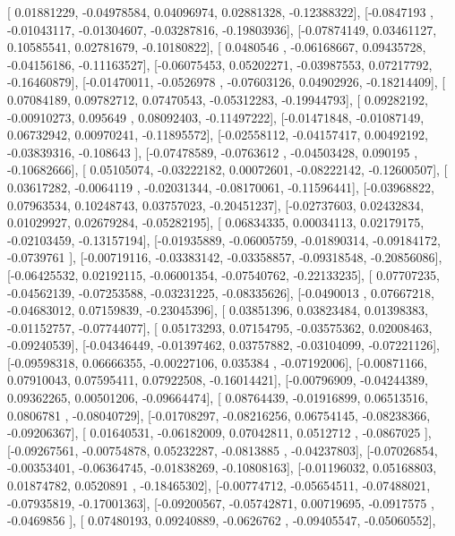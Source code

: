 \documentclass{article}
\begin{document}
       [ 0.01881229, -0.04978584,  0.04096974,  0.02881328, -0.12388322],
       [-0.0847193 , -0.01043117, -0.01304607, -0.03287816, -0.19803936],
       [-0.07874149,  0.03461127,  0.10585541,  0.02781679, -0.10180822],
       [ 0.0480546 , -0.06168667,  0.09435728, -0.04156186, -0.11163527],
       [-0.06075453,  0.05202271, -0.03987553,  0.07217792, -0.16460879],
       [-0.01470011, -0.0526978 , -0.07603126,  0.04902926, -0.18214409],
       [ 0.07084189,  0.09782712,  0.07470543, -0.05312283, -0.19944793],
       [ 0.09282192, -0.00910273,  0.095649  ,  0.08092403, -0.11497222],
       [-0.01471848, -0.01087149,  0.06732942,  0.00970241, -0.11895572],
       [-0.02558112, -0.04157417,  0.00492192, -0.03839316, -0.108643  ],
       [-0.07478589, -0.0763612 , -0.04503428,  0.090195  , -0.10682666],
       [ 0.05105074, -0.03222182,  0.00072601, -0.08222142, -0.12600507],
       [ 0.03617282, -0.0064119 , -0.02031344, -0.08170061, -0.11596441],
       [-0.03968822,  0.07963534,  0.10248743,  0.03757023, -0.20451237],
       [-0.02737603,  0.02432834,  0.01029927,  0.02679284, -0.05282195],
       [ 0.06834335,  0.00034113,  0.02179175, -0.02103459, -0.13157194],
       [-0.01935889, -0.06005759, -0.01890314, -0.09184172, -0.0739761 ],
       [-0.00719116, -0.03383142, -0.03358857, -0.09318548, -0.20856086],
       [-0.06425532,  0.02192115, -0.06001354, -0.07540762, -0.22133235],
       [ 0.07707235, -0.04562139, -0.07253588, -0.03231225, -0.08335626],
       [-0.0490013 ,  0.07667218, -0.04683012,  0.07159839, -0.23045396],
       [ 0.03851396,  0.03823484,  0.01398383, -0.01152757, -0.07744077],
       [ 0.05173293,  0.07154795, -0.03575362,  0.02008463, -0.09240539],
       [-0.04346449, -0.01397462,  0.03757882, -0.03104099, -0.07221126],
       [-0.09598318,  0.06666355, -0.00227106,  0.035384  , -0.07192006],
       [-0.00871166,  0.07910043,  0.07595411,  0.07922508, -0.16014421],
       [-0.00796909, -0.04244389,  0.09362265,  0.00501206, -0.09664474],
       [ 0.08764439, -0.01916899,  0.06513516,  0.0806781 , -0.08040729],
       [-0.01708297, -0.08216256,  0.06754145, -0.08238366, -0.09206367],
       [ 0.01640531, -0.06182009,  0.07042811,  0.0512712 , -0.0867025 ],
       [-0.09267561, -0.00754878,  0.05232287, -0.0813885 , -0.04237803],
       [-0.07026854, -0.00353401, -0.06364745, -0.01838269, -0.10808163],
       [-0.01196032,  0.05168803,  0.01874782,  0.0520891 , -0.18465302],
       [-0.00774712, -0.05654511, -0.07488021, -0.07935819, -0.17001363],
       [-0.09200567, -0.05742871,  0.00719695, -0.0917575 , -0.0469856 ],
       [ 0.07480193,  0.09240889, -0.0626762 , -0.09405547, -0.05060552],
\end{document}
